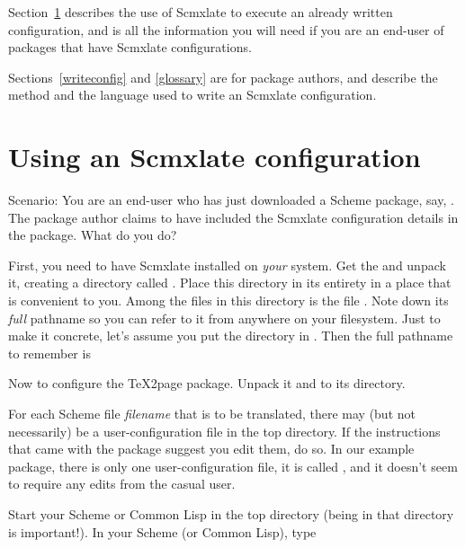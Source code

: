 Section~\ref{useconfig} describes the use of Scmxlate
to execute an already written configuration, and is all
the information you will need if you are an
end-user of packages that have Scmxlate configurations.

Sections~\ref{writeconfig} and \ref{glossary} are for
package authors, and describe the method and the
language used to write an Scmxlate configuration.

\bigbreak


\tableofcontents

\ifx\shipout\totheWeb\else
\vfill\eject
\fi

\section{Using an Scmxlate configuration}
\label{useconfig}

Scenario: You are an end-user who has just downloaded a
Scheme package, say,
.
The package author claims to have included the Scmxlate
configuration details in the package.  What do
you do?

First, you need to have Scmxlate installed on {\em
your} system.  Get the  and unpack
it, creating a directory called .  Place
this directory in its entirety in a place that is
convenient to you.  Among the files in this directory
is the file .  Note down
its {\em full} pathname so you can refer to it from
anywhere on your filesystem.
Just to make it concrete, let's assume you put the
 directory in .  Then the
full pathname to remember is


Now to configure the TeX2page package.  Unpack it
and  to its directory.

For each Scheme file {\em filename}  that is to be
translated, there may (but not necessarily) be a
user-configuration file  in
the top directory.  If the instructions that came with
the package suggest you edit them, do so.  In our
example package, there is only one user-configuration
file, it is called , and it
doesn't seem to require any edits from the casual user.

Start your Scheme or Common Lisp in the top directory
(being in that directory is important!).  In your
Scheme (or Common Lisp), type

